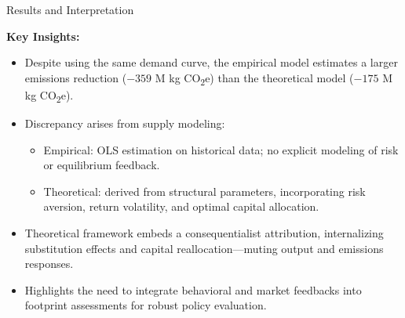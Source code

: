 \documentclass{beamer}
\begin{document}
\begin{frame}{Results and Interpretation}
\footnotesize
\vspace{-2.0em}



\vspace{0.5em}
\textbf{Key Insights:}
\begin{itemize}
    \item Despite using the same demand curve, the empirical model estimates a larger emissions reduction (\(-359\) M kg CO\textsubscript{2}e) than the theoretical model (\(-175\) M kg CO\textsubscript{2}e).
    \item Discrepancy arises from supply modeling:  
        \begin{itemize}
            \item Empirical: OLS estimation on historical data; no explicit modeling of risk or equilibrium feedback.  
            \item Theoretical: derived from structural parameters, incorporating risk aversion, return volatility, and optimal capital allocation.
        \end{itemize}
    \item Theoretical framework embeds a consequentialist attribution, internalizing substitution effects and capital reallocation—muting output and emissions responses.
    \item Highlights the need to integrate behavioral and market feedbacks into footprint assessments for robust policy evaluation.
\end{itemize}

\end{frame}


\end{document}
